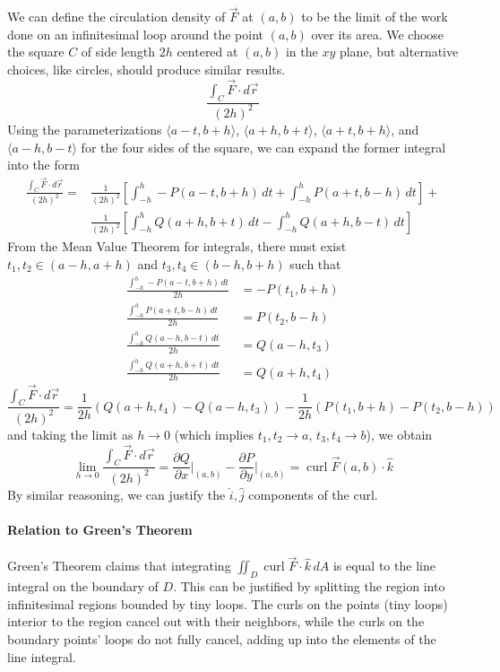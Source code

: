 \documentclass{article}
\DeclareMathOperator{\curl}{curl}
\newcommand{\vect}[1]{\ensuremath{\overrightarrow{#1}}}
\begin{document}
We can define the circulation density of $\vect{F}$ at $(a,b)$ to be the limit of the work done on an infinitesimal loop around the point $(a,b)$ over its area. We choose the square $C$ of side length $2h$ centered at $(a,b)$ in the $xy$ plane, but alternative choices, like circles, should produce similar results.
$$\frac{\int_C \vect{F}\cdot d\vect{r}}{(2h)^2}$$
Using the parameterizations $\langle a-t, b+h \rangle$, $\langle a+h,b+t \rangle$, $\langle a+t, b+h \rangle$, and $\langle a-h,b-t\rangle$ for the four sides of the square, we can expand the former integral into the form
\begin{align*}
    \frac{\int_C \vect{F}\cdot d\vect{r}}{(2h)^2}=&\frac{1}{(2h)^2}\left[\int_{-h}^h-P(a-t,b+h)\,dt + \int_{-h}^hP(a+t,b-h)\,dt\right] +\\
    &\frac{1}{(2h)^2}\left[\int_{-h}^hQ(a+h,b+t)\,dt-\int_{-h}^hQ(a+h,b-t)\,dt\right]
\end{align*}
From the Mean Value Theorem for integrals, there must exist $t_1,t_2\in(a-h,a+h)$ and $t_3,t_4\in(b-h,b+h)$ such that
\begin{align*}
    \frac{\int_{-h}^h-P(a-t,b+h)\,dt}{2h}&=-P(t_1,b+h)\\
    \frac{\int_{-h}^h P(a+t,b-h)\,dt}{2h}&= P(t_2,b-h)\\
    \frac{\int_{-h}^h Q(a-h,b-t)\,dt}{2h}&=Q(a-h,t_3)\\
    \frac{\int_{-h}^h Q(a+h,b+t)\,dt}{2h}&=Q(a+h,t_4)
\end{align*}
$$\frac{\int_C \vect{F}\cdot d\vect{r}}{(2h)^2}=\frac{1}{2h}\left(Q(a+h,t_4)-Q(a-h,t_3)\right)-\frac{1}{2h}\left(P(t_1,b+h) - P(t_2,b-h)\right)$$
and taking the limit as $h\to0$ (which implies $t_1,t_2 \to a$, $t_3,t_4\to b$), we obtain
$$\lim_{h\to0}\frac{\int_C \vect{F}\cdot d\vect{r}}{(2h)^2} = \frac{\partial Q}{\partial x}\Bigr|_{(a,b)} - \frac{\partial P}{\partial y}\Bigr|_{(a,b)} = \curl{\vect{F}}(a,b)\cdot\hat{k}$$
By similar reasoning, we can justify the $\hat{i},\hat{j}$ components of the curl.

\paragraph{Relation to Green's Theorem}
Green's Theorem claims that integrating $\iint_D\curl{\vect{F}}\cdot\hat{k}\,dA$ is equal to the line integral on the boundary of $D$. This can be justified by splitting the region into infinitesimal regions bounded by tiny loops. The curls on the points (tiny loops) interior to the region cancel out with their neighbors, while the curls on the boundary points' loops do not fully cancel, adding up into the elements of the line integral.
\end{document}
